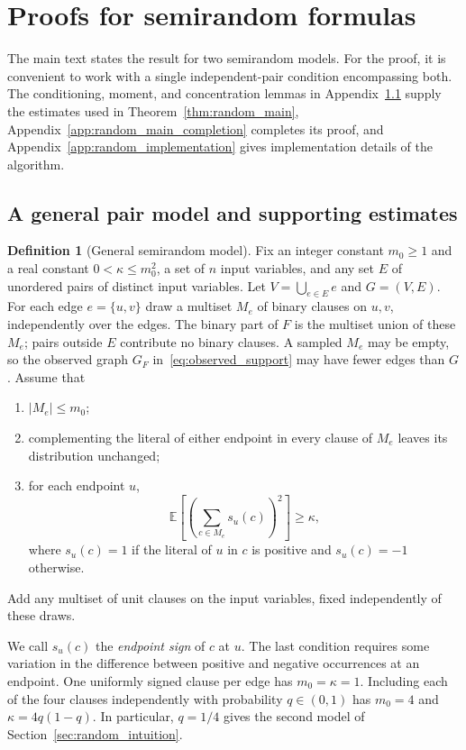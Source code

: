 \documentclass[11pt,a4paper]{article}
\theoremstyle{definition}
\newtheorem{definition}[theorem]{Definition}
\theoremstyle{remark}
\newcommand{\E}{\mathbb E}
\begin{document}
\section{Proofs for semirandom formulas}\label{app:random_signs}

The main text states the result for two semirandom models.
For the proof, it is convenient to work with a single independent-pair
condition encompassing both. The conditioning, moment, and concentration
lemmas in Appendix~\ref{app:random_estimates} supply the estimates used in
Theorem~\ref{thm:random_main}, Appendix~\ref{app:random_main_completion}
completes its proof, and Appendix~\ref{app:random_implementation} gives
implementation details of the algorithm.

\subsection{A general pair model and supporting estimates}\label{app:random_estimates}

\begin{definition}[General semirandom model]\label{def:invariant}
Fix an integer constant $m_0\ge1$ and a real constant $0<\kappa\le m_0^2$, a set of $n$ input variables,
and any set $E$ of unordered pairs of distinct input variables.
Let $V=\bigcup_{e\in E}e$ and $G=(V,E)$.
For each edge $e=\{u,v\}$ draw a multiset $M_e$ of binary clauses on
$u,v$, independently over the edges. The binary part of $F$ is the
multiset union of these $M_e$; pairs outside $E$ contribute no binary
clauses. A sampled $M_e$ may be empty, so the observed graph $G_F$
in~\eqref{eq:observed_support} may have fewer edges than $G$. Assume that
\begin{enumerate}
\item $|M_e|\le m_0$;
\item complementing the literal of either endpoint in every clause of
$M_e$ leaves its distribution unchanged;
\item for each endpoint $u$,
\[
 \E\left[\left(\sum_{c\in M_e}s_u(c)\right)^2\right]\ge\kappa,
\]
where $s_u(c)=1$ if the literal of $u$ in $c$ is positive and
$s_u(c)=-1$ otherwise.
\end{enumerate}
Add any multiset of unit clauses on the input variables, fixed
independently of these draws.
\end{definition}

We call $s_u(c)$ the \emph{endpoint sign} of $c$ at $u$. The last
condition requires some variation in the difference between positive
and negative occurrences at an endpoint. One uniformly signed
clause per edge has $m_0=\kappa=1$. Including each of the four clauses
independently with probability $q\in(0,1)$ has $m_0=4$ and
$\kappa=4q(1-q)$. In particular, $q=1/4$ gives the second model of
Section~\ref{sec:random_intuition}.
\end{document}
